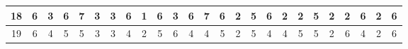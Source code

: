 \begin{sidewaystable}[]
\begin{tabular}{|c|c|c|c|c|c|c|c|c|c|c|c|c|c|c|c|c|c|c|c|c|c|c|c|c|}
    18      & 6                                               & 3                                               & 6                                               & 7                                               & 3                                               & 3                                               & 6                                               & 1                                               & 6                                               & 3                                                & 6                                                & 7                                                 &    6                                               & 2                                               & 5                                               & 6                                               & 2                                               & 2                                               & 5                                               & 2                                               & 2                                               & 6                                                & 2                                                & 6                                                \\ \hline
    19      & 6                                               & 4                                               & 5                                               & 5                                               & 3                                               & 3                                               & 4                                               & 2                                               & 5                                               & 6                                                & 4                                                & 4                                                 &    5                                               & 2                                               & 5                                               & 4                                               & 4                                               & 5                                               & 5                                               & 2                                               & 6                                               & 4                                                & 2                                                & 6                                                \\ \hline

\end{tabular}
\end{sidewaystable}
